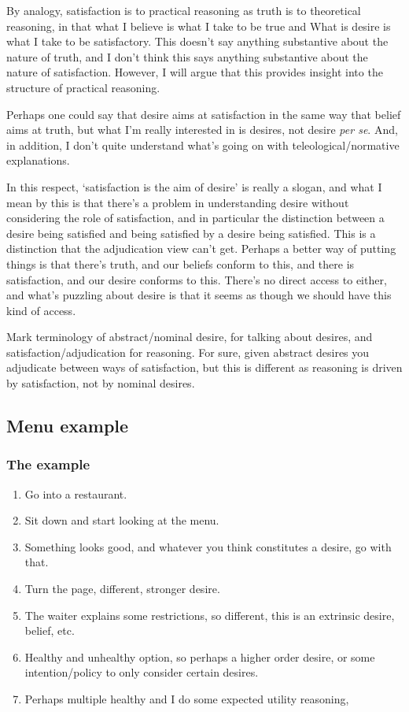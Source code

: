 \documentclass[10pt]{article}
\begin{document}
By analogy, satisfaction is to practical reasoning as truth is to theoretical reasoning, in that what I believe is what I take to be true and What is desire is what I take to be satisfactory.
This doesn't say anything substantive about the nature of truth, and I don't think this says anything substantive about the nature of satisfaction.
However, I will argue that this provides insight into the structure of practical reasoning.

Perhaps one could say that desire aims at satisfaction in the same way that belief aims at truth, but what I'm really interested in is desires, not desire \emph{per se}.
And, in addition, I don't quite understand what's going on with teleological/normative explanations.

In this respect, `satisfaction is the aim of desire' is really a slogan, and what I mean by this is that there's a problem in understanding desire without considering the role of satisfaction, and in particular the distinction between a desire being satisfied and being satisfied by a desire being satisfied.
This is a distinction that the adjudication view can't get.
Perhaps a better way of putting things is that there's truth, and our beliefs conform to this, and there is satisfaction, and our desire conforms to this.
There's no direct access to either, and what's puzzling about desire is that it seems as though we should have this kind of access.

Mark terminology of abstract/nominal desire, for talking about desires, and satisfaction/adjudication for reasoning.
For sure, given abstract desires you adjudicate between ways of satisfaction, but this is different as reasoning is driven by satisfaction, not by nominal desires.

\subsection{Menu example}
\label{sec:menu-example}

\subsubsection{The example}
\label{sec:example}

\begin{enumerate}
\item Go into a restaurant.
\item Sit down and start looking at the menu.
\item Something looks good, and whatever you think constitutes a desire, go with that.
\item Turn the page, different, stronger desire.
\item The waiter explains some restrictions, so different, this is an extrinsic desire, belief, etc.
\item Healthy and unhealthy option, so perhaps a higher order desire, or some intention/policy to only consider certain desires.
\item Perhaps multiple healthy and I do some expected utility reasoning,
\end{enumerate}
\end{document}
